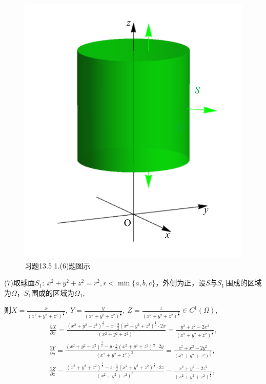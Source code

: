 \documentclass[12pt,UTF8]{ctexart}
\newcommand{\pp}[2]{\frac{\partial #1}{\partial #2}}
\begin{document}
\begin{enumerate}
\begin{figure}[H]
\begin{center}
\includegraphics[height=0.5\textheight]{Figures24/Fig13-5-1-6.pdf}
\end{center}
\caption{习题13.5 1.(6)题图示}
\label{13-5-1-6}
\end{figure}

(7)取球面$S_1:\ x^2+y^2+z^2=r^2,r<\min\{a,b,c\}$，外侧为正，设$S$与$S_1^-$围成的区域为$\Omega$，$S_1$围成的区域为$\Omega_1$,

则$X=\frac x{(x^2+y^2+z^2)^{\frac32}},\ Y=\frac y{(x^2+y^2+z^2)^{\frac32}},\ Z=\frac z{(x^2+y^2+z^2)^{\frac32}}\in C^1(\Omega)$,
\[\begin{aligned}
\pp Xx=\frac{(x^2+y^2+z^2)^{\frac32}-x\cdot\frac32(x^2+y^2+z^2)^{\frac12}\cdot2x}{(x^2+y^2+z^2)^3}=\frac{y^2+z^2-2x^2}{(x^2+y^2+z^2)^{\frac52}},\\
\pp Yy=\frac{(x^2+y^2+z^2)^{\frac32}-y\cdot\frac32(x^2+y^2+z^2)^{\frac12}\cdot2y}{(x^2+y^2+z^2)^3}=\frac{z^2+x^2-2y^2}{(x^2+y^2+z^2)^{\frac52}},\\
\pp Zz=\frac{(x^2+y^2+z^2)^{\frac32}-z\cdot\frac32(x^2+y^2+z^2)^{\frac12}\cdot2z}{(x^2+y^2+z^2)^3}=\frac{x^2+y^2-2z^2}{(x^2+y^2+z^2)^{\frac52}},
\end{aligned}\]


\end{enumerate}
\end{document}
